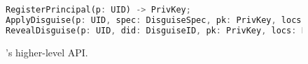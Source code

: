 \begin{figure}[t]
\begin{lstlisting}[language=Rust, style=rust]
RegisterPrincipal(p: UID) -> PrivKey;
ApplyDisguise(p: UID, spec: DisguiseSpec, pk: PrivKey, locs: Vec<Locator>) -> (DisguiseID, Vec<Locator>);
RevealDisguise(p: UID, did: DisguiseID, pk: PrivKey, locs: Locator);
\end{lstlisting}
\caption{\sys's higher-level API.}
\label{f:api-high}
\end{figure}

